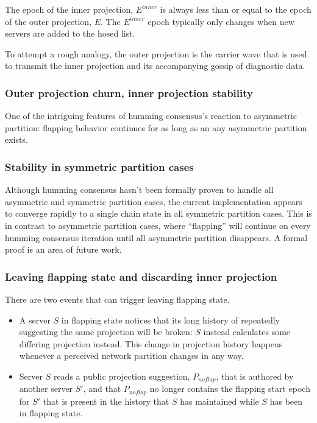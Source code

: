 \documentclass[preprint,10pt]{sigplanconf}
\begin{document}
The epoch of the inner projection, $E^{inner}$ is always less than or
equal to the epoch of the outer projection, $E$.  The $E^{inner}$
epoch typically only changes when new servers are added to the hosed
list.

To attempt a rough analogy, the outer projection is the carrier wave
that is used to transmit the inner projection and its accompanying
gossip of diagnostic data.

\subsubsection{Outer projection churn, inner projection stability}

One of the intriguing features of humming consensus's reaction to
asymmetric partition: flapping behavior continues for as long as
an any asymmetric partition exists.

\subsubsection{Stability in symmetric partition cases}

Although humming consensus hasn't been formally proven to handle all
asymmetric and symmetric partition cases, the current implementation
appears to converge rapidly to a single chain state in all symmetric
partition cases.  This is in contrast to asymmetric partition cases,
where ``flapping'' will continue on every humming consensus iteration
until all asymmetric partition disappears.  A formal proof is an area of
future work.

\subsubsection{Leaving flapping state and discarding inner projection}

There are two events that can trigger leaving flapping state.

\begin{itemize}

\item A server $S$ in flapping state notices that its long history of
  repeatedly suggesting the same projection will be broken:
  $S$ instead calculates some differing projection instead.
  This change in projection history happens whenever a perceived network
  partition changes in any way.

\item Server $S$ reads a public projection suggestion, $P_{noflap}$, that is
  authored by another server $S'$, and that $P_{noflap}$ no longer
  contains the flapping start epoch for $S'$ that is present in the
  history that $S$ has maintained while $S$ has been in
  flapping state.

\end{itemize}
\end{document}
